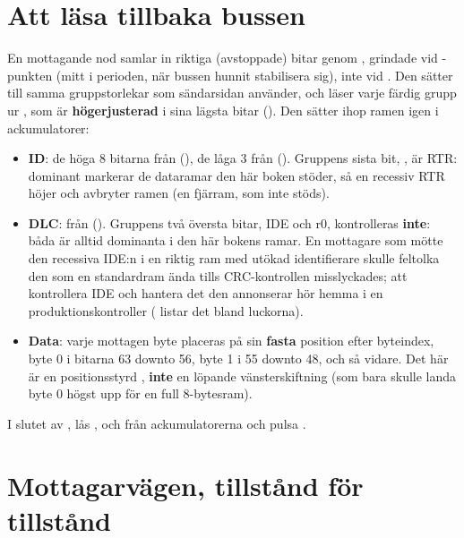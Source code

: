 
\section{Att läsa tillbaka bussen}
\label{c17:sec:readback}

En mottagande nod samlar in riktiga (avstoppade) bitar genom , grindade vid
-punkten (mitt i perioden, när bussen hunnit stabilisera sig), inte vid
. Den sätter  till samma gruppstorlekar som sändarsidan
använder, och läser varje färdig grupp ur , som är \textbf{högerjusterad} i
sina lägsta  bitar (). Den sätter ihop ramen igen i ackumulatorer:
\begin{itemize}
  \item \textbf{ID}: de höga 8 bitarna från  (), de låga 3
    från  (). Gruppens sista bit, , är
    RTR: dominant markerar de dataramar den här boken stöder, så en recessiv RTR höjer 
    och avbryter ramen (en fjärram, som inte stöds).
  \item \textbf{DLC}: från  (). Gruppens två översta bitar,
    IDE och r0, kontrolleras \textbf{inte}: båda är alltid dominanta i den här bokens ramar. En
    mottagare som mötte den recessiva IDE:n i en riktig ram med utökad identifierare skulle feltolka
    den som en standardram ända tills CRC-kontrollen misslyckades; att kontrollera IDE och hantera
    det den annonserar hör hemma i en produktionskontroller ( listar det bland
    luckorna).
  \item \textbf{Data}: varje mottagen byte placeras på sin \textbf{fasta} position efter byteindex,
    byte 0 i bitarna 63 downto 56, byte 1 i 55 downto 48, och så vidare. Det här är en positionsstyrd
    , \textbf{inte} en löpande vänsterskiftning (som bara skulle landa byte 0 högst upp
    för en full 8-bytesram).
\end{itemize}

I slutet av , lås ,  och  från ackumulatorerna
och pulsa .

\section{Mottagarvägen, tillstånd för tillstånd}
\label{c17:sec:states}

